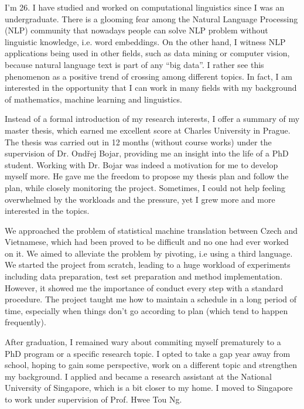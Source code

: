 \documentclass[a4paper, 11pt]{scrartcl}
\begin{document}

I'm 26. I have studied and worked on computational linguistics since I was an undergraduate. 
There is a glooming fear among the Natural Language Processing (NLP) community that nowadays people can solve NLP problem without linguistic knowledge, i.e. word embeddings.
On the other hand, I witness NLP applications being used in other fields, such as data mining or computer vision, because natural language text is part of any ``big data''. 
I rather see this phenomenon as a positive trend of crossing among different topics. 
In fact, I am interested in the opportunity that I can work in many fields with my background of mathematics, machine learning and linguistics. 


Instead of a formal introduction of my research interests, I offer a summary of my master thesis, which earned me excellent score at Charles University in Prague. 
The thesis was carried out in 12 months (without course works) under the supervision of Dr. Ond{\v r}ej Bojar, providing me an insight into the life of a PhD student.
Working with Dr. Bojar was indeed a motivation for me to develop myself more. 
He gave me the freedom to propose my thesis plan and follow the plan, while closely monitoring the project.
Sometimes, I could not help feeling overwhelmed by the workloads and the pressure, yet I grew more and more interested in the topics.

We approached the problem of statistical machine translation between Czech and Vietnamese, which had been proved to be difficult and no one had ever worked on it.
We aimed to alleviate the problem by pivoting, i.e using a third language. 
We started the project from scratch, leading to a huge workload of experiments including data preparation, test set preparation and method implementation. 
However, it showed me the importance of conduct every step with a standard procedure.
The project taught me how to maintain a schedule in a long period of time, especially when things don't go according to plan (which tend to happen frequently).


After graduation, I remained wary about commiting myself prematurely to a PhD program or a specific research topic. 
I opted to take a gap year away from school, hoping to gain some perspective, work on a different topic and strengthen my background.
I applied and became a research assistant at the National University of Singapore, which is a bit closer to my home.
I moved to Singapore to work under supervision of Prof. Hwee Tou Ng.  
\end{document}
